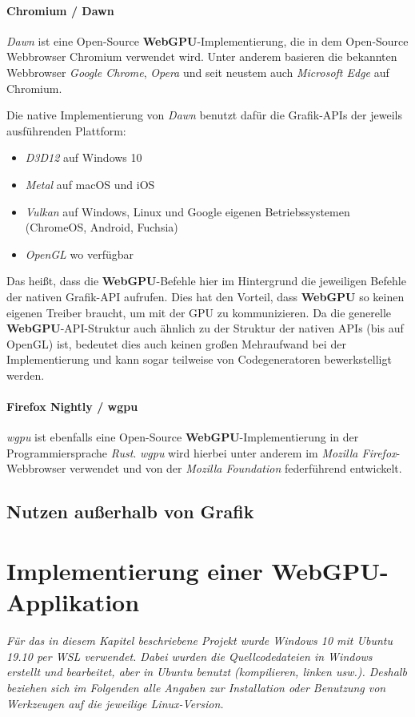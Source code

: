 \documentclass[oneside]{ausarbeitung}
\newcommand*{\quotize}[1]{\glqq #1\grqq}
\begin{document}
\subsubsection{Chromium \cite{chromium} / Dawn \cite{google:dawn}}
\textit{Dawn} ist eine Open-Source \textbf{WebGPU}-Implementierung, die in dem Open-Source Webbrowser Chromium verwendet wird. Unter anderem basieren die bekannten Webbrowser \textit{Google Chrome}, \textit{Opera} und seit neustem auch \textit{Microsoft Edge} auf Chromium. 

Die \quotize{native} Implementierung von \textit{Dawn} benutzt dafür die Grafik-APIs der jeweils ausführenden Plattform:

\begin{itemize}
\item{\textit{D3D12} auf Windows 10}
\item{\textit{Metal} auf macOS und iOS}
\item{\textit{Vulkan} auf Windows, Linux und Google eigenen Betriebssystemen (ChromeOS, Android, Fuchsia)}
\item{\textit{OpenGL} wo verfügbar}
\end{itemize}

Das heißt, dass die \textbf{WebGPU}-Befehle hier im Hintergrund die jeweiligen Befehle der nativen Grafik-API aufrufen. Dies hat den Vorteil, dass \textbf{WebGPU} so keinen eigenen Treiber braucht, um mit der \ac{GPU} zu kommunizieren. Da die generelle \textbf{WebGPU}-API-Struktur auch ähnlich zu der Struktur der nativen APIs (bis auf OpenGL) ist, bedeutet dies auch keinen großen Mehraufwand bei der Implementierung und kann sogar teilweise von Codegeneratoren bewerkstelligt werden.

\subsubsection{Firefox Nightly \cite{mozilla:firefox_nightly} / wgpu \cite{mozilla:wgpu}}
\textit{wgpu} ist ebenfalls eine Open-Source \textbf{WebGPU}-Implementierung in der Programmiersprache \textit{Rust}. \textit{wgpu} wird hierbei unter anderem im \textit{Mozilla Firefox}-Webbrowser verwendet und von der \textit{Mozilla Foundation} federführend entwickelt.
\section{Nutzen außerhalb von Grafik}

\chapter{Implementierung einer WebGPU-Applikation}
\label{cha:implementierung}
\textit{Für das in diesem Kapitel beschriebene Projekt wurde Windows 10 mit Ubuntu 19.10 per \ac{WSL} \cite{microsoft:wsl} verwendet. Dabei wurden die Quellcodedateien in Windows erstellt und bearbeitet, aber in Ubuntu benutzt (kompilieren, linken usw.). Deshalb beziehen sich im Folgenden alle Angaben zur Installation oder Benutzung von Werkzeugen auf die jeweilige Linux-Version.}
\end{document}
